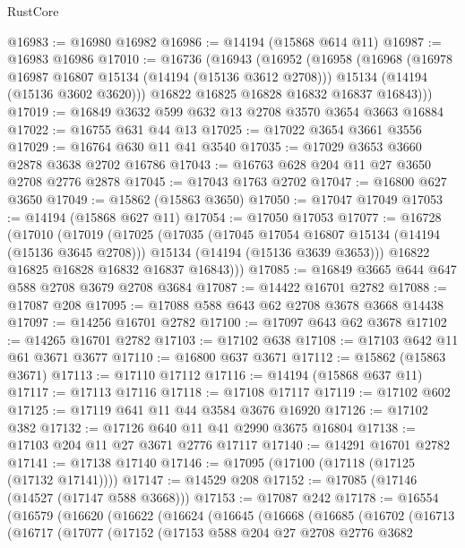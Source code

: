 \begin{lexlean}{RustCore}
\begin{coremodule}
@16983 := @16980 @16982
@16986 := @14194 (@15868 @614 @11)
@16987 := @16983 @16986
@17010 := @16736
    (@16943
      (@16952
        (@16958
          (@16968
            (@16978 @16987 @16807 @15134 (@14194 (@15136 @3612 @2708)))
            @15134
            (@14194 (@15136 @3602 @3620)))
          @16822
          @16825
          @16828
          @16832
          @16837
          @16843)))
@17019 := @16849 @3632 @599 @632 @13 @2708 @3570 @3654 @3663 @16884
@17022 := @16755 @631 @44 @13
@17025 := @17022 @3654 @3661 @3556
@17029 := @16764 @630 @11 @41 @3540
@17035 := @17029 @3653 @3660 @2878 @3638 @2702 @16786
@17043 := @16763 @628 @204 @11 @27 @3650 @2708 @2776 @2878
@17045 := @17043 @1763 @2702
@17047 := @16800 @627 @3650
@17049 := @15862 (@15863 @3650)
@17050 := @17047 @17049
@17053 := @14194 (@15868 @627 @11)
@17054 := @17050 @17053
@17077 := @16728
    (@17010
      (@17019
        (@17025
          (@17035
            (@17045 @17054 @16807 @15134 (@14194 (@15136 @3645 @2708)))
            @15134
            (@14194 (@15136 @3639 @3653)))
          @16822
          @16825
          @16828
          @16832
          @16837
          @16843)))
@17085 := @16849 @3665 @644 @647 @588 @2708 @3679 @2708 @3684
@17087 := @14422 @16701 @2782
@17088 := @17087 @208
@17095 := @17088 @588 @643 @62 @2708 @3678 @3668 @14438
@17097 := @14256 @16701 @2782
@17100 := @17097 @643 @62 @3678
@17102 := @14265 @16701 @2782
@17103 := @17102 @638
@17108 := @17103 @642 @11 @61 @3671 @3677
@17110 := @16800 @637 @3671
@17112 := @15862 (@15863 @3671)
@17113 := @17110 @17112
@17116 := @14194 (@15868 @637 @11)
@17117 := @17113 @17116
@17118 := @17108 @17117
@17119 := @17102 @602
@17125 := @17119 @641 @11 @44 @3584 @3676 @16920
@17126 := @17102 @382
@17132 := @17126 @640 @11 @41 @2990 @3675 @16804
@17138 := @17103 @204 @11 @27 @3671 @2776 @17117
@17140 := @14291 @16701 @2782
@17141 := @17138 @17140
@17146 := @17095 (@17100 (@17118 (@17125 (@17132 @17141))))
@17147 := @14529 @208
@17152 := @17085 (@17146 (@14527 (@17147 @588 @3668)))
@17153 := @17087 @242
@17178 := @16554
    (@16579
      (@16620
        (@16622
          (@16624
            (@16645
              (@16668
                (@16685
                  (@16702
                    (@16713
                      (@16717
                        (@17077
                          (@17152
                            (@17153
                              @588
                              @204
                              @27
                              @2708
                              @2776
                              @3682

\end{coremodule}
\end{lexlean}
